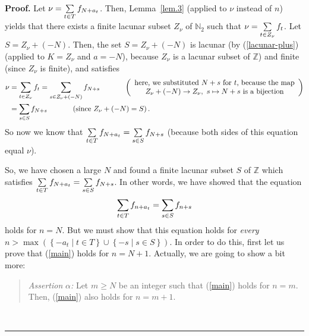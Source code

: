 \documentclass[numbers=enddot,12pt,final,onecolumn,notitlepage]{scrartcl}%
\numberwithin{exer}{section}
\theoremstyle{definition}
\newenvironment{statement}{\begin{quote}}{\end{quote}}
\newenvironment{proof}[1][Proof]{\noindent\textbf{#1.} }{\ \rule{0.5em}{0.5em}}
\let\sumnonlimits\sum
\renewcommand{\sum}{\sumnonlimits\limits}
\begin{document}
\begin{proof}
Let $\nu=\sum\limits_{t\in T}f_{N+a_{t}}$. Then, Lemma~\ref{lem.3} (applied to
$\nu$ instead of $n$) yields that there exists a finite lacunar subset
$Z_{\nu}$ of $\mathbb{N}_{2}$ such that $\nu=\sum\limits_{t\in Z_{\nu}}f_{t}$.
Let $S=Z_{\nu}+\left(  -N\right)  $. Then, the set $S=Z_{\nu}+\left(
-N\right)  $ is lacunar (by (\ref{lacunar-plus}) (applied to $K=Z_{\nu}$ and
$a=-N$), because $Z_{\nu}$ is a lacunar subset of $\mathbb{Z}$) and finite
(since $Z_{\nu}$ is finite), and satisfies%
\begin{align*}
\nu &  =\sum\limits_{t\in Z_{\nu}}f_{t}=\sum\limits_{s\in Z_{\nu}+\left(
-N\right)  }f_{N+s}\ \ \ \ \ \ \ \ \ \ \left(
\begin{array}
[c]{c}%
\text{here, we substituted }N+s\text{ for }t\text{, because the map}\\
Z_{\nu}+\left(  -N\right)  \rightarrow Z_{\nu},\text{ }s\mapsto N+s\text{ is a
bijection}%
\end{array}
\right) \\
&  =\sum\limits_{s\in S}f_{N+s}\ \ \ \ \ \ \ \ \ \ \left(  \text{since }%
Z_{\nu}+\left(  -N\right)  =S\right)  .
\end{align*}
So now we know that $\sum\limits_{t\in T}f_{N+a_{t}}=\sum\limits_{s\in
S}f_{N+s}$ (because both sides of this equation equal $\nu$).

So, we have chosen a large $N$ and found a finite lacunar subset $S$ of
$\mathbb{Z}$ which satisfies $\sum\limits_{t\in T}f_{N+a_{t}}=\sum
\limits_{s\in S}f_{N+s}$. In other words, we have showed that the equation
\begin{equation}
\sum\limits_{t\in T}f_{n+a_{t}}=\sum\limits_{s\in S}f_{n+s} \label{main}%
\end{equation}
holds for $n=N$. But we must show that this equation holds for \textit{every}
$n>\max\left(  \left\{  -a_{t}\mid t\in T\right\}  \cup\left\{  -s\mid s\in
S\right\}  \right)  $. In order to do this, first let us prove that
(\ref{main}) holds for $n=N+1$. Actually, we are going to show a bit more:

\begin{statement}
\textit{Assertion }$\alpha$\textit{:} Let $m\geq N$ be an integer such that
(\ref{main}) holds for $n=m$. Then, (\ref{main}) also holds for $n=m+1$.
\end{statement}


\end{proof}
\end{document}
